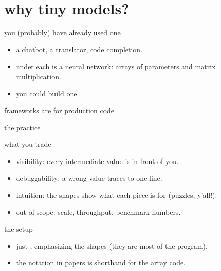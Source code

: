   \section{why tiny models?}
	\begin{frame}{you (probably) have already used one}
    \begin{itemize}
      \item a chatbot, a translator, code completion.
      \item under each is a neural network: arrays of parameters and matrix
				multiplication.
      \item \textcolor{mute}{you could build one.}
    \end{itemize}
  \end{frame}

  \begin{frame}{frameworks are for production code}
  \end{frame}

  \begin{frame}{the practice}
  \end{frame}

  \begin{frame}{what you trade}
    \begin{itemize}
      \item[\textcolor{cwTeal}{+}] visibility: every intermediate value is in front of you.
      \item[\textcolor{cwTeal}{+}] debuggability: a wrong value traces to one line.
      \item[\textcolor{cwTeal}{+}] intuition: the shapes show what each piece is
				for (puzzles, y’all!).
      \item[\textcolor{mute}{\textbar}] \textcolor{mute}{out of scope: scale, throughput, benchmark numbers.}
    \end{itemize}
  \end{frame}

  \begin{frame}{the setup}
    \begin{itemize}
      \item just , emphasizing the shapes (they are
				most of the program).
      \item the notation in papers is shorthand for the array code.
    \end{itemize}
  \end{frame}

